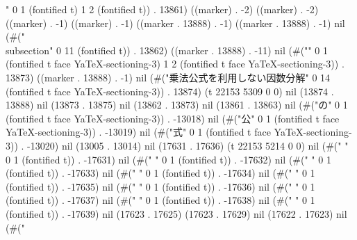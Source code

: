 " 0 1 (fontified t) 1 2 (fontified t)) . 13861) ((marker) . -2) ((marker) . -2) ((marker) . -1) ((marker) . -1) ((marker . 13888) . -1) ((marker . 13888) . -1) nil (#("\\subsection" 0 11 (fontified t)) . 13862) ((marker . 13888) . -11) nil (#("{}" 0 1 (fontified t face YaTeX-sectioning-3) 1 2 (fontified t face YaTeX-sectioning-3)) . 13873) ((marker . 13888) . -1) nil (#("乗法公式を利用しない因数分解" 0 14 (fontified t face YaTeX-sectioning-3)) . 13874) (t 22153 5309 0 0) nil (13874 . 13888) nil (13873 . 13875) nil (13862 . 13873) nil (13861 . 13863) nil (#("の" 0 1 (fontified t face YaTeX-sectioning-3)) . -13018) nil (#("公" 0 1 (fontified t face YaTeX-sectioning-3)) . -13019) nil (#("式" 0 1 (fontified t face YaTeX-sectioning-3)) . -13020) nil (13005 . 13014) nil (17631 . 17636) (t 22153 5214 0 0) nil (#("
" 0 1 (fontified t)) . -17631) nil (#(" " 0 1 (fontified t)) . -17632) nil (#(" " 0 1 (fontified t)) . -17633) nil (#(" " 0 1 (fontified t)) . -17634) nil (#(" " 0 1 (fontified t)) . -17635) nil (#(" " 0 1 (fontified t)) . -17636) nil (#(" " 0 1 (fontified t)) . -17637) nil (#(" " 0 1 (fontified t)) . -17638) nil (#(" " 0 1 (fontified t)) . -17639) nil (17623 . 17625) (17623 . 17629) nil (17622 . 17623) nil (#("
